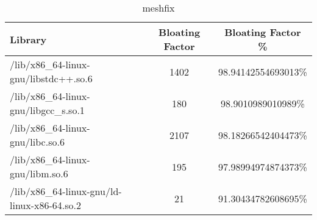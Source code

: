 \begin{table}[h]

\centering
\caption{meshfix}
\footnotesize
\begin{tabular}{l|c|c}
\toprule
Library & Bloating Factor & Bloating Factor \% \\ \midrule
\colorbox{gray!20}{/lib/x86\_64-linux-gnu/libstdc++.so.6} & 1402 & 98.94142554693013\% \\ \hline
\colorbox{gray!20}{/lib/x86\_64-linux-gnu/libgcc\_s.so.1} & 180 & 98.9010989010989\% \\ \hline
\colorbox{gray!20}{/lib/x86\_64-linux-gnu/libc.so.6} & 2107 & 98.18266542404473\% \\ \hline
\colorbox{gray!20}{/lib/x86\_64-linux-gnu/libm.so.6} & 195 & 97.98994974874373\% \\ \hline
/lib/x86\_64-linux-gnu/ld-linux-x86-64.so.2 & 21 & 91.30434782608695\% \\ \hline
\bottomrule
\end{tabular}
\end{table}

